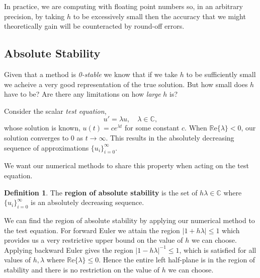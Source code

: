 \documentclass[12pt, twoside]{report}
\theoremstyle{plain}
\theoremstyle{definition}
\newtheorem{definition}{Definition}[chapter]
\theoremstyle{definition}
\providecommand{\abs}[1]{\lvert#1\rvert}
\begin{document}
        In practice, we are computing with floating point numbers so, in an 
        arbitrary precision, by taking $h$ to be excessively small then the 
        accuracy that we might theoretically gain will be counteracted by round-off errors.
        

        \subsection{Absolute Stability}
        \label{2_absolute_stability}
            Given that a method is \textit{0-stable} we know that if we take 
            $h$ to be sufficiently small we acheive a very good representation
            of the true solution. But how small does $h$ have to be? Are there any limitations on how \textit{large} $h$ is?

            Consider the scalar \textit{test equation},
            \begin{equation}
            \label{2_test_equation}
                u' = \lambda u, \quad \lambda \in \mathbb{C},
            \end{equation}
            whose solution is known, $u(t)=c e^{\lambda t}$ for some constant 
            $c$. When $\mathbb{R}\text{e}\{\lambda\} < 0$, our solution 
            converges to 0 as $t\to\infty$. This results in the absolutely 
            decreasing sequence of approximations 
            ${\lbrace u_i \rbrace}_{i=0}^{\infty}$.

            We want our numerical methods to share this property when acting 
            on the test equation.

            \begin{definition}
                The \textbf{region of absolute stability} is the set of 
                $h\lambda\in\mathbb{C}$ where 
                ${\lbrace u_i \rbrace}_{i=0}^{\infty}$ is an absolutely
                decreasing sequence.
            \end{definition}

            We can find the region of absolute stability by applying our 
            numerical method to the test equation. For forward Euler we attain 
            the region $\abs{1+h\lambda} \le 1$ which provides us a very 
            restrictive upper bound on the value of $h$ we can choose. 
            Applying backward Euler gives the region 
            $\abs{1-h\lambda}^{-1} \le 1$, which is satisfied for all values 
            of $h, \lambda$ where $\mathbb{R}\text{e}\{\lambda\} \le 0$.
            Hence the entire left half-plane is in the region of stability and there is no restriction on the value of $h$ we can choose.
\end{document}
